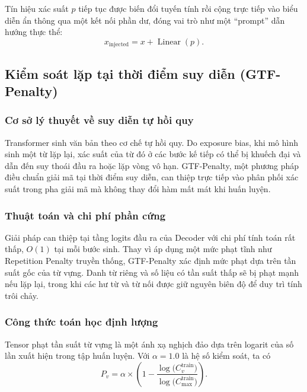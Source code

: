 \documentclass[11pt,a4paper]{article}
\numberwithin{equation}{section}
\begin{document}
Tín hiệu xác suất $p$ tiếp tục được biến đổi tuyến tính rồi cộng trực tiếp vào biểu diễn ẩn thông qua một kết nối phần dư, đóng vai trò như một ``prompt'' dẫn hướng thực thể:
\begin{equation}
x_{\text{injected}}=x+\operatorname{Linear}(p).
\label{eq:ner-injection}
\end{equation}

\subsection{Kiểm soát lặp tại thời điểm suy diễn (GTF-Penalty)}

\subsubsection{Cơ sở lý thuyết về suy diễn tự hồi quy}

Transformer sinh văn bản theo cơ chế tự hồi quy. Do exposure bias, khi mô hình sinh một từ lặp lại, xác suất của từ đó ở các bước kế tiếp có thể bị khuếch đại và dẫn đến suy thoái đầu ra hoặc lặp vòng vô hạn. GTF-Penalty, một phương pháp điều chuẩn giải mã tại thời điểm suy diễn, can thiệp trực tiếp vào phân phối xác suất trong pha giải mã mà không thay đổi hàm mất mát khi huấn luyện.

\subsubsection{Thuật toán và chi phí phần cứng}

Giải pháp can thiệp tại tầng logits đầu ra của Decoder với chi phí tính toán rất thấp, $O(1)$ tại mỗi bước sinh. Thay vì áp dụng một mức phạt tĩnh như Repetition Penalty truyền thống, GTF-Penalty xác định mức phạt dựa trên tần suất gốc của từ vựng. Danh từ riêng và số liệu có tần suất thấp sẽ bị phạt mạnh nếu lặp lại, trong khi các hư từ và từ nối được giữ nguyên biên độ để duy trì tính trôi chảy.

\subsubsection{Công thức toán học định lượng}

Tensor phạt tần suất từ vựng là một ánh xạ nghịch đảo dựa trên logarit của số lần xuất hiện trong tập huấn luyện. Với $\alpha=1.0$ là hệ số kiểm soát, ta có
\begin{equation}
P_v=\alpha\times\left(
1-\frac{\log\bigl(C_v^{\text{train}}\bigr)}
{\log\bigl(C_{\max}^{\text{train}}\bigr)}
\right).
\label{eq:frequency-penalty}
\end{equation}
\end{document}
